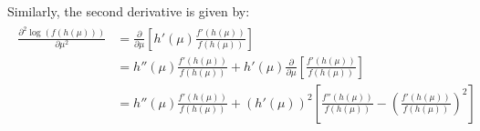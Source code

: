 \documentclass{amsart}
\begin{document}
Similarly, the second derivative is given by:
\begin{align}
	\begin{split}
		\frac{\partial^2 \log(f(h(\mu)))}{\partial \mu^2}
		& = \frac{\partial}{\partial \mu}\left[h'(\mu)\frac{f'(h(\mu))}{f(h(\mu))}\right]\\
		& = h''(\mu)\frac{f'(h(\mu))}{f(h(\mu))} 
			+ h'(\mu)\frac{\partial}{\partial \mu}\left[\frac{f'(h(\mu))}{f(h(\mu))}\right]\\
		& = h''(\mu)\frac{f'(h(\mu))}{f(h(\mu))} 
		+ \left(h'(\mu)\right)^2\left[\frac{f''(h(\mu))}{f(h(\mu))} - \left(\frac{f'(h(\mu))}{f(h(\mu))}\right)^2\right]
	\end{split}
\end{align}



\end{document}
